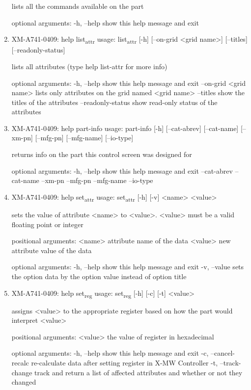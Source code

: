 \documentclass[11pt]{article}
\begin{document}
\begin{enumerate}
lists all the commands available on the part

optional arguments:
  -h, --help  show this help message and exit

\item XM-A741-0409: help list\textsubscript{attr}
\label{sec:org8ba5cec}
usage: list\textsubscript{attr} [-h] [--on-grid <grid name>] [--titles] [--readonly-status]

lists all attributes (type help list-attr for more info)

optional arguments:
  -h, --help            show this help message and exit
  --on-grid <grid name>
                        lists only attributes on the grid named <grid name>
  --titles              show the titles of the attributes
  --readonly-status     show read-only status of the attributes

\item XM-A741-0409: help part-info
\label{sec:org20763a8}
usage: part-info  [-h] [--cat-abrev] [--cat-name] [--xm-pn] [--mfg-pn] [--mfg-name]
        [--io-type]

returns info on the part this control screen was designed for

optional arguments:
  -h, --help   show this help message and exit
  --cat-abrev
  --cat-name
  --xm-pn
  --mfg-pn
  --mfg-name
  --io-type

\item XM-A741-0409: help set\textsubscript{attr}
\label{sec:org157dfdf}
usage: set\textsubscript{attr} [-h] [-v] <name> <value>

sets the value of attribute <name> to <value>. <value> must be a valid
floating point or integer

positional arguments:
  <name>       attribute name of the data
  <value>      new attribute value of the data

optional arguments:
  -h, --help   show this help message and exit
  -v, --value  sets the option data by the option value instead of option
               title

\item XM-A741-0409: help set\textsubscript{reg}
\label{sec:orgeab7200}
usage: set\textsubscript{reg} [-h] [-c] [-t] <value>

assigns <value> to the appropriate register based on how the part would
interpret <value>

positional arguments:
  <value>              the value of register in hexadecimal

optional arguments:
  -h, --help           show this help message and exit
  -c, --cancel-recalc  re-calculate data after setting register in X-MW
                       Controller
  -t, --track-change   track and return a list of affected attributes and
                       whether or not they changed


\end{enumerate}
\end{document}
